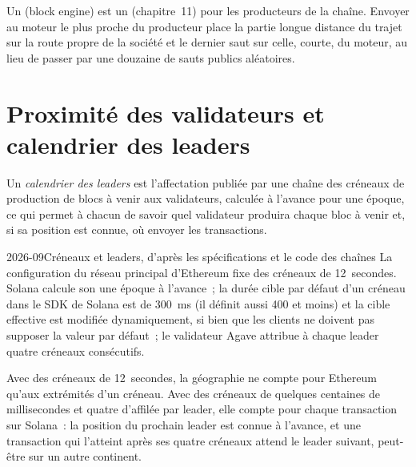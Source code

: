 Un  (block engine) est un  (chapitre~11) pour les producteurs de la chaîne. Envoyer au moteur le plus proche du producteur place la partie longue distance du trajet
sur la route propre de la société et le dernier saut sur celle, courte, du moteur, au lieu de passer par une douzaine de sauts publics aléatoires.

\section{Proximité des validateurs et calendrier des leaders}

\begin{definition}\label{def:nw:on-chain-connectivity:leader}
Un \emph{calendrier des leaders} est l'affectation publiée par une chaîne des créneaux de production de blocs à venir aux validateurs, calculée à
l'avance pour une époque, ce qui permet à chacun de savoir quel validateur produira chaque bloc à venir et, si sa position est connue, où envoyer
les transactions.
\end{definition}

\begin{dated}{2026-09}{Créneaux et leaders, d'après les spécifications et le code des chaînes}\label{dat:nw:on-chain-connectivity:chains}
La configuration du réseau principal d'Ethereum fixe des créneaux de 12~secondes. Solana calcule son  une époque à l'avance~; la durée cible par défaut d'un créneau dans le SDK de Solana
est de \qty{300}{\milli\second} (il définit aussi 400 et moins) et la cible effective est modifiée dynamiquement, si bien que les clients ne doivent pas supposer
la valeur par défaut~; le validateur Agave attribue à chaque leader quatre créneaux consécutifs.
\end{dated}

Avec des créneaux de 12~secondes, la géographie ne compte pour Ethereum qu'aux extrémités d'un créneau. Avec des créneaux de quelques centaines de millisecondes et quatre d'affilée par
leader, elle compte pour chaque transaction sur Solana~: la position du prochain leader est connue à l'avance, et une transaction qui l'atteint après ses
quatre créneaux attend le leader suivant, peut-être sur un autre continent.

\label{lst:nw:on-chain-connectivity:leader}

